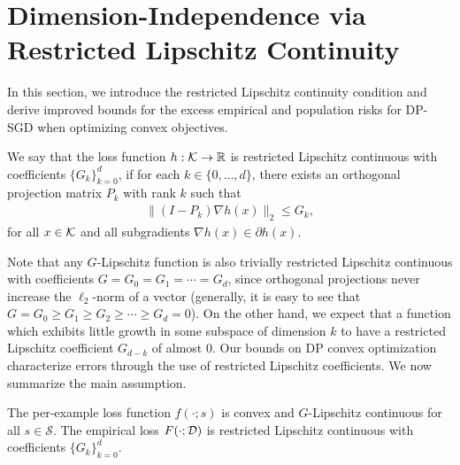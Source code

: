 \section[Dimension-Independence via Restricted Lipschitz Continuity]{Dimension-Independence via \\Restricted Lipschitz Continuity}\label{sec:theory}
In this section, we introduce the restricted Lipschitz continuity condition and derive improved bounds for the excess empirical and population risks for DP-SGD when optimizing convex objectives.

\begin{defi}
We say that the loss function $h: \mathcal K \to \mathbb{R}$ is restricted Lipschitz continuous with coefficients $\{G_k\}_{k=0}^d$, if
for each $k \in \{0, \dots, d\}$, there exists an orthogonal projection matrix $P_k$ with rank $k$ such that 
\begin{align*}
    \|(I-P_k)\nabla h(x) \|_2\le G_k,
\end{align*}
for all $x \in \mathcal K$ and all subgradients $\nabla h(x) \in \partial h(x)$.
\end{defi}

Note that any $G$-Lipschitz function is also trivially restricted Lipschitz continuous with coefficients $G = G_0 = G_1 = \cdots = G_d$, since orthogonal projections never increase the $\ell_2$-norm of a vector (generally, it is easy to see that $G = G_{0}\ge G_{1}\geq G_{2}\geq\cdots\geq G_{d}=0$). 
On the other hand, we expect that a function which exhibits little growth in some subspace of dimension $k$ to have a restricted Lipschitz coefficient $G_{d-k}$ of almost 0.
Our bounds on DP convex optimization characterize errors through the use of restricted Lipschitz coefficients. 
We now summarize the main assumption.
\begin{assu}
\label{assm:G_k}
The per-example loss function $f(\cdot; s)$ is convex and $G$-Lipschitz continuous for all $s \in \mathcal{S}$.
The empirical loss $F(\cdot; \mathcal D)$ is restricted Lipschitz continuous with coefficients $\{G_k\}_{k = 0}^d$.
\end{assu}


